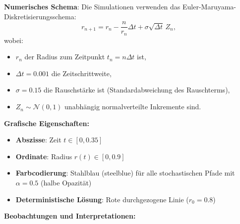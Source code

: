 \documentclass[a4paper,12pt]{article}
\theoremstyle{definition}
\begin{document}
\textbf{Numerisches Schema}: Die Simulationen verwenden das Euler-Maruyama-Diskretisierungsschema:
\[
r_{n+1} = r_n - \frac{n}{r_n} \Delta t + \sigma \sqrt{\Delta t} \, Z_n,
\]
wobei:
\begin{itemize}
	\item $r_n$ der Radius zum Zeitpunkt $t_n = n \Delta t$ ist,
	\item $\Delta t = 0.001$ die Zeitschrittweite,
	\item $\sigma = 0.15$ die Rauschstärke ist (Standardabweichung des Rauschterms),
	\item $Z_n \sim \mathcal{N}(0,1)$ unabhängig normalverteilte Inkremente sind.
\end{itemize}

\textbf{Grafische Eigenschaften:}
\begin{itemize}
	\item \textbf{Abszisse}: Zeit $t \in [0, 0.35]$
	\item \textbf{Ordinate}: Radius $r(t) \in [0, 0.9]$
	\item \textbf{Farbcodierung}: Stahlblau (steelblue) für alle stochastischen Pfade mit $\alpha = 0.5$ (halbe Opazität)
	\item \textbf{Deterministische Lösung}: Rote durchgezogene Linie ($r_0 = 0.8$)
\end{itemize}

\textbf{Beobachtungen und Interpretationen:}
\end{document}
